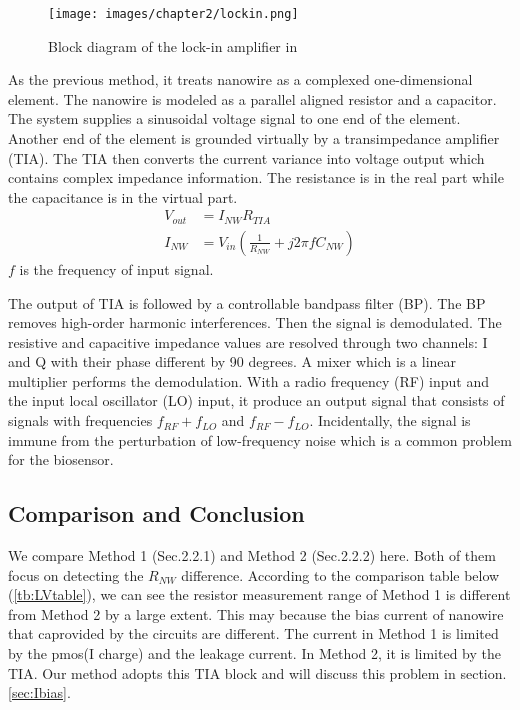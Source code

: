 \begin{figure}[!htbp]
        \centering
        \texttt{[image: images/chapter2/lockin.png]}
        \caption{Block diagram of the lock-in amplifier in \cite{Jlockin}}
        \label{fig:lockin}
\end{figure}

As the previous method, it treats nanowire as a complexed one-dimensional element. The nanowire is modeled as a parallel aligned resistor and a capacitor.
The system supplies a sinusoidal voltage signal to one end of the element.
Another end of the element is grounded virtually by a transimpedance amplifier (TIA).
The TIA then converts the current variance into voltage output which contains complex impedance information.
The resistance is in the real part while the capacitance is in the virtual part.
\setlength{\mathindent}{5.5cm}
\begin{align}
    V_{out} &= I_{NW}R_{TIA} \\
    I_{NW} &= V_{in}(\frac{1}{R_{NW}} + j 2\pi fC_{NW})
\end{align}
$f$ is the frequency of input signal.

The output of TIA is followed by a controllable bandpass filter (BP).
The BP removes high-order harmonic interferences.
Then the signal is demodulated.
The resistive and capacitive impedance values are resolved through two channels: I and Q with their phase different by 90 degrees.
A mixer which is a linear multiplier performs the demodulation.
With a radio frequency (RF) input and the input local oscillator (LO) input, it produce an output signal that consists of signals with frequencies $f_{RF} + f_{LO}$ and $f_{RF} - f_{LO}$.
Incidentally, the signal is immune from the perturbation of low-frequency noise which is a common problem for the biosensor.

\subsection{Comparison and Conclusion} \label{sec:ch2CC}
We compare Method 1 (Sec.2.2.1) and Method 2 (Sec.2.2.2) here.
Both of them focus on detecting the $R_{NW}$ difference.
According to the comparison table below (\ref{tb:LVtable}), we can see the resistor measurement range of Method 1 is different from Method 2 by a large extent.
This may because the bias current of nanowire that caprovided by the circuits are different.
The current in Method 1 is limited by the pmos(I charge) and the leakage current.
In Method 2, it is limited by the TIA.
Our method adopts this TIA block and will discuss this problem in section.\ref{sec:Ibias}.

